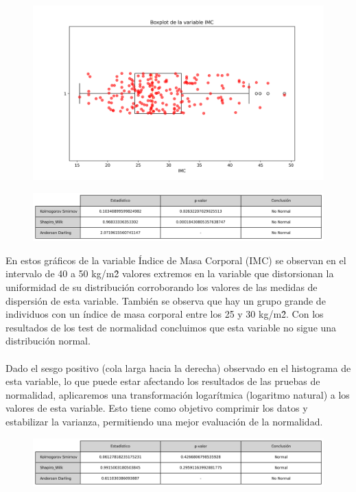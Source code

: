 \documentclass[a4paper, 12pt]{article}
\begin{document}
\begin{figure}[H]
    \centering
    \includegraphics[width=1\textwidth]{img/Boxplot/Boxplt_IMC.png}
\end{figure}

\begin{figure}[H]
    \centering
    \includegraphics[width=1\textwidth]{img/Tablas/test_normalidad_IMC.png}
\end{figure}


En estos gráficos de la variable Índice de Masa Corporal (IMC) se observan en el intervalo de 40 a 50 kg/m\^2 valores extremos en 
la variable que distorsionan la uniformidad de su distribución corroborando los valores de las medidas de dispersión de esta variable. 
También se observa que hay un grupo grande de individuos con un índice de masa corporal entre los 25 y 30 kg/m\^2. Con los resultados 
de los test de normalidad concluimos que esta variable no sigue una distribución normal.
\\ \\

Dado el sesgo positivo (cola larga hacia la derecha) observado en el histograma de esta variable, lo que puede estar afectando los resultados de las pruebas de normalidad, aplicaremos una transformación logarítmica (logaritmo natural) a los valores de esta variable. Esto tiene como objetivo comprimir los datos y estabilizar la varianza, permitiendo una mejor evaluación de la normalidad.
\begin{figure}[H]
    \centering
    \includegraphics[width=1\textwidth]{img/Tablas/test_normalidad_log_IMC.png}
\end{figure}
\end{document}
